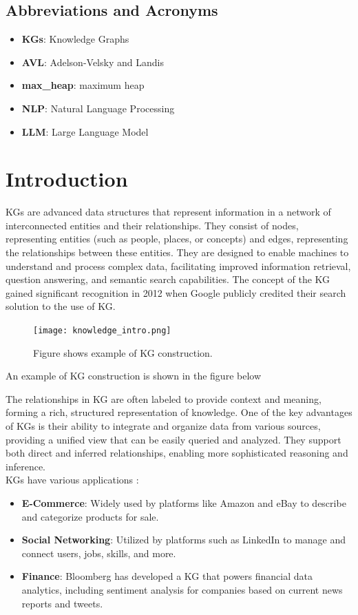 \documentclass[conference]{IEEEtran}
\begin{document}
\subsection{Abbreviations and Acronyms}\label{AA}

\begin{itemize}
    \item \textbf{KGs}: Knowledge Graphs
    \item \textbf{AVL}: Adelson-Velsky and Landis
    \item \textbf{max\_heap}: maximum heap
    \item \textbf{NLP}: Natural Language Processing
    \item \textbf{LLM}: Large Language Model
\end{itemize}

\section{Introduction}
KGs are advanced data structures that represent information in a network of interconnected entities and their relationships. They consist of nodes, representing entities (such as people, places, or concepts) and edges, representing the relationships between these entities. They are designed to enable machines to understand and process complex data, facilitating improved information retrieval, question answering, and semantic search capabilities.
The concept of the KG gained significant recognition in 2012 when Google \cite{b7} publicly credited their search solution to the use of KG.


\begin{figure}[htbp]
\centering
\texttt{[image: knowledge\_intro.png]} %
\caption{Figure shows example of KG construction.}
\label{fig}
\end{figure}

An example of KG construction is shown in the figure below


The relationships in KG are often labeled to provide context and meaning, forming a rich, structured representation of knowledge.
One of the key advantages of KGs is their ability to integrate and organize data from various sources, providing a unified view that can be easily queried and analyzed. They support both direct and inferred relationships, enabling more sophisticated reasoning and inference.
\\KGs have various applications : 
\begin{itemize}
    \item \textbf{E-Commerce}: Widely used by platforms like Amazon\cite{b2, b3} and eBay\cite{b4} to describe and categorize products for sale.
    \item \textbf{Social Networking}: Utilized by platforms such as LinkedIn\cite{b5} to manage and connect users, jobs, skills, and more.
    \item \textbf{Finance}: Bloomberg\cite{b6} has developed a KG that powers financial data analytics, including sentiment analysis for companies based on current news reports and tweets.
\end{itemize}
\end{document}
